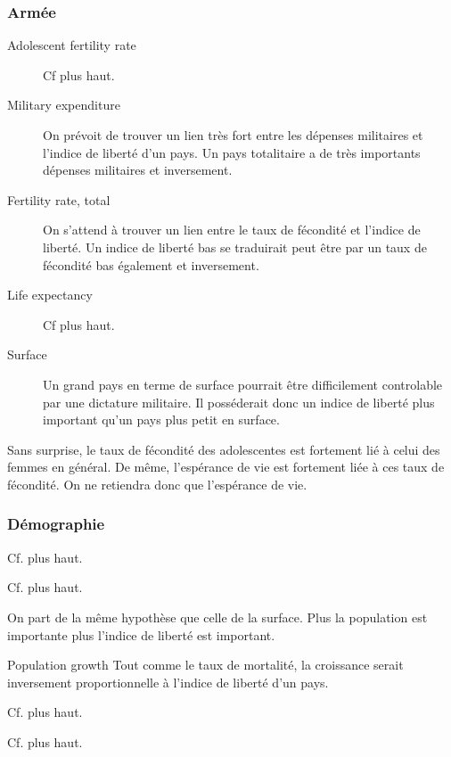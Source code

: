 \subsubsection{Armée}
\begin{description}
\item [Adolescent fertility rate]
Cf plus haut.
\item [Military expenditure]
On prévoit de trouver un lien très fort entre les dépenses militaires et l'indice de liberté d'un pays. Un pays totalitaire a de très importants dépenses militaires et inversement.
\item [Fertility rate, total]
On s'attend à trouver un lien entre le taux de fécondité et l'indice de liberté. Un indice de liberté bas se traduirait peut être par un taux de fécondité bas également et inversement.
\item [Life expectancy]
Cf plus haut.
\item [Surface]
Un grand pays en terme de surface pourrait être difficilement controlable par une dictature militaire. Il posséderait donc un indice de liberté plus important qu'un pays plus petit en surface.
\end{description}

Sans surprise, le taux de fécondité des adolescentes est fortement lié à celui des femmes en général. De même, l'espérance de vie est fortement liée à ces taux de fécondité. On ne retiendra donc que l'espérance de vie.

\subsubsection{Démographie} 
\begin{description}
\item [Fertility rate]
Cf. plus haut.
\item [Adolescent fertility]
Cf. plus haut.
\item [Population totale]
On part de la même hypothèse que celle de la surface. Plus la population est importante plus l'indice de liberté est important.
\item Population growth
Tout comme le taux de mortalité, la croissance serait inversement proportionnelle à l'indice de liberté d'un pays.
\item [Life expectancy]
Cf. plus haut.
\item [Surface]
Cf. plus haut.
\end{description}

